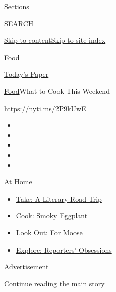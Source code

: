 Sections

SEARCH

\protect\hyperlink{site-content}{Skip to
content}\protect\hyperlink{site-index}{Skip to site index}

\href{https://www.nytimes.com/section/food}{Food}

\href{https://myaccount.nytimes.com/auth/login?response_type=cookie\&client_id=vi}{}

\href{https://www.nytimes.com/section/todayspaper}{Today's Paper}

\href{/section/food}{Food}\textbar{}What to Cook This Weekend

\url{https://nyti.ms/2P9kUwE}

\begin{itemize}
\item
\item
\item
\item
\item
\end{itemize}

\href{https://www.nytimes.com/spotlight/at-home?action=click\&pgtype=Article\&state=default\&region=TOP_BANNER\&context=at_home_menu}{At
Home}

\begin{itemize}
\tightlist
\item
  \href{https://www.nytimes.com/2020/07/28/books/time-for-a-literary-road-trip.html?action=click\&pgtype=Article\&state=default\&region=TOP_BANNER\&context=at_home_menu}{Take:
  A Literary Road Trip}
\item
  \href{https://www.nytimes.com/2020/07/29/magazine/bored-with-your-home-cooking-some-smoky-eggplant-will-fix-that.html?action=click\&pgtype=Article\&state=default\&region=TOP_BANNER\&context=at_home_menu}{Cook:
  Smoky Eggplant}
\item
  \href{https://www.nytimes.com/2020/07/27/travel/moose-michigan-isle-royale.html?action=click\&pgtype=Article\&state=default\&region=TOP_BANNER\&context=at_home_menu}{Look
  Out: For Moose}
\item
  \href{https://www.nytimes.com/interactive/2020/at-home/even-more-reporters-editors-diaries-lists-recommendations.html?action=click\&pgtype=Article\&state=default\&region=TOP_BANNER\&context=at_home_menu}{Explore:
  Reporters' Obsessions}
\end{itemize}

Advertisement

\protect\hyperlink{after-top}{Continue reading the main story}

